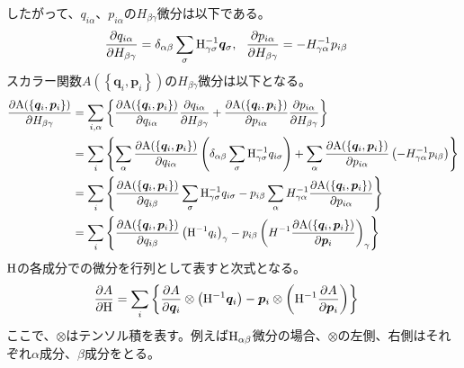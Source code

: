 \documentclass[11pt,a4paper,uplatex]{jsarticle}
\begin{document}
したがって、$q_{i\alpha}$、$p_{i\alpha}$の$H_{\beta \gamma}$微分は以下である。
\begin{align}
    \frac{\partial q_{i \alpha}}{\partial H_{\beta \gamma}} 
    &= \delta_{\alpha \beta} \sum_{\sigma} {\rm H}^{-1}_{\gamma \sigma} \bm{q}_{\sigma}, \ \
    \frac{\partial  p_{i \alpha}}{\partial H_{\beta \gamma}} = - H^{-1}_{\gamma \alpha} p_{i \beta}  
\end{align}
スカラー関数$A\left(\left\{ \bm{q}_{i}, \bm{p}_{i} \right\}\right)$の$H_{\beta \gamma}$微分は以下となる。
\begin{align}
    \frac{\partial {\rm A}(\{\bm{q}_{i}, \bm{p}_{i}\})}{\partial H_{\beta \gamma}}  &= \sum_{i, \alpha} \left\{ \frac{\partial {\rm A}(\{\bm{q}_{i}, \bm{p}_{i}\})}{\partial q_{i \alpha}} \frac{\partial q_{i \alpha}}{\partial H_{\beta \gamma}} 
    +  \frac{\partial {\rm A}(\{\bm{q}_{i}, \bm{p}_{i}\})}{\partial p_{i \alpha}} \frac{\partial p_{i \alpha}}{\partial H_{\beta \gamma}} \right\} \\
    &= \sum_{i} \left\{ \sum_{\alpha} \frac{\partial {\rm A}(\{\bm{q}_{i}, \bm{p}_{i}\})}{\partial q_{i \alpha}} \left( \delta_{\alpha \beta} \sum_{\sigma} {\rm H}^{-1}_{\gamma \sigma} q_{i \sigma} \right) + \sum_{\alpha} \frac{\partial {\rm A}(\{\bm{q}_{i}, \bm{p}_{i}\})}{\partial p_{i \alpha}} \left(-H_{\gamma \alpha}^{-1} p_{i\beta} \right) \right\} \\
    &= \sum_{i} \left\{ \frac{\partial {\rm A}(\{\bm{q}_{i}, \bm{p}_{i}\})}{\partial q_{i \beta}} \sum_{\sigma} {\rm H}^{-1}_{\gamma \sigma} q_{i \sigma} 
    -  p_{i\beta} \sum_{\alpha} H_{\gamma \alpha}^{-1} \frac{\partial {\rm A}(\{\bm{q}_{i}, \bm{p}_{i}\})}{\partial p_{i \alpha}} \right\} \\
    &= \sum_{i} \left\{ \frac{\partial {\rm A}(\{\bm{q}_{i}, \bm{p}_{i}\})}{\partial q_{i \beta}} \left({\rm H}^{-1} q_{i}\right)_{\gamma}
    -  p_{i \beta} \left( H^{-1} \frac{\partial {\rm A}(\{\bm{q}_{i}, \bm{p}_{i}\})}{\partial \bm{p}_{i}}  \right)_{\gamma} \right\}
\end{align}
${\rm H}$の各成分での微分を行列として表すと次式となる。
\begin{align}
    \frac{\partial A}{\partial {\rm H}} &= \sum_{i} \left\{
    \frac{\partial A}{\partial \bm{q}_{i}} \otimes \left({\rm H}^{-1} \bm{q}_{i}\right)
    -  \bm{p}_{i} \otimes \left( {\rm H^{-1}} \frac{\partial A}{\partial \bm{p}_{i}}  \right) 
    \right\}
\end{align}
ここで、$\otimes$はテンソル積を表す。例えば${\rm H}_{\alpha \beta}$微分の場合、$\otimes$の左側、右側はそれぞれ$\alpha$成分、$\beta$成分をとる。
\end{document}
